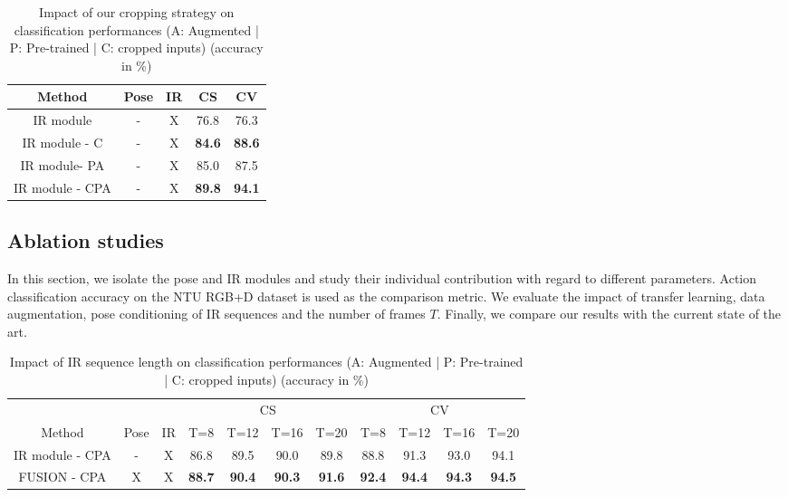 \documentclass[letterpaper, 10 pt, conference]{ieeeconf}
\begin{document}
\begin{table}[t]
\caption{Impact of our cropping strategy on classification performances (A: Augmented | P: Pre-trained | C: cropped inputs) (accuracy in \%)}
\label{cropping_results}
\begin{center}
\begin{tabular}{ccccc}
Method & Pose & IR & CS & CV \\
\hline \hline
IR module & - & X & 76.8 & 76.3 \\
IR module - C & - & X & \textbf{84.6} & \textbf{88.6} \\
 \hline
IR module- PA & - & X & 85.0 & 87.5 \\
IR module - CPA & - & X & \textbf{89.8} & \textbf{94.1} \\ 
\end{tabular}
\end{center}
\end{table}

\subsection{Ablation studies}

In this section, we isolate the pose and IR modules and study their individual contribution with regard to different parameters. Action classification accuracy on the NTU RGB+D dataset is used as the comparison metric. We evaluate the impact of transfer learning, data augmentation, pose conditioning of IR sequences and the number of frames $T$. Finally, we compare our results with the current state of the art.

\begin{table*}[t]
\caption{Impact of IR sequence length on classification performances (A: Augmented | P: Pre-trained | C: cropped inputs) (accuracy in \%)}
\label{seq_len_results}
\begin{center}
\begin{tabular}{ccc|cccc|cccc}
& & & \multicolumn{4}{c|}{ CS} & \multicolumn{4}{c}{ CV } \\
\cline{4-11}
Method & Pose & IR & T=8 & T=12 & T=16 & T=20 & T=8 & T=12 & T=16 & T=20 \\ 
\hline \hline
IR module - CPA & - & X & 86.8 & 89.5 & 90.0 & 89.8 & 88.8 & 91.3 & 93.0 & 94.1 \\
FUSION - CPA & X & X & \textbf{88.7} & \textbf{90.4} & \textbf{90.3} & \textbf{91.6} & \textbf{92.4} & \textbf{94.4} & \textbf{94.3} & \textbf{94.5} \\ 
\end{tabular} 
\end{center}
\end{table*}
\end{document}
